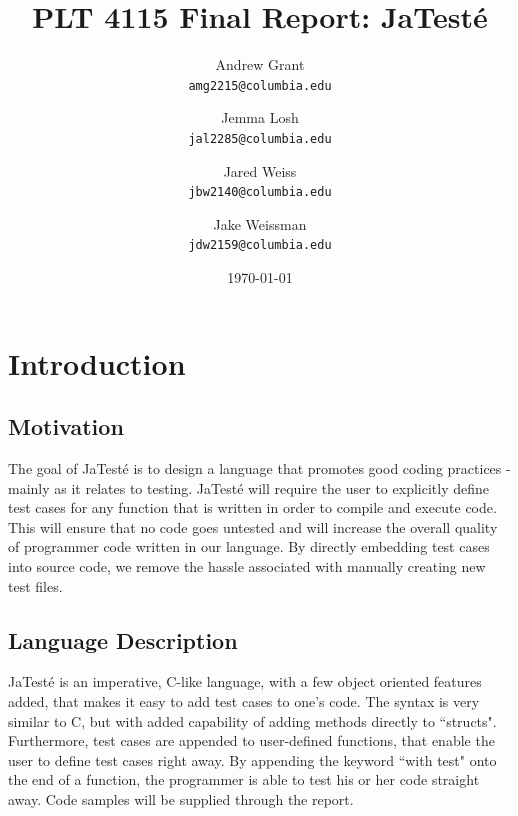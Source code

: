 \documentclass{article}
\title{PLT 4115 Final Report: \textbf{JaTest\'{e}}}
\author{
	Andrew Grant\\
	\texttt{amg2215@columbia.edu}
	\and
	Jemma Losh\\
	\texttt{jal2285@columbia.edu}
	\and
	Jared Weiss\\
	\texttt{jbw2140@columbia.edu}
	\and
	Jake Weissman\\
	\texttt{jdw2159@columbia.edu}
}
\date{\today}
\begin{document}
\maketitle
\newpage

\tableofcontents
\newpage

\section{Introduction}

\subsection{Motivation}
The goal of JaTest\'{e} is to design a language that promotes good coding practices - mainly as it relates to testing.  JaTest\'{e} will require the user to explicitly define test cases for any function that is written in order to compile and execute code.  This will ensure that no code goes untested and will increase the overall quality of programmer code written in our language. By directly embedding test cases into source code, we remove the hassle associated with manually creating new test files.

\subsection {Language Description}
JaTest\'{e} is an imperative, C-like language, with a few object oriented features added, that makes it easy to add test cases to one's code. The syntax is very similar to C, but with added capability of adding methods directly 
to ``structs". Furthermore, test cases are appended to user-defined functions, that enable the user to define test cases right away. By appending the keyword ``with test" onto the end of a function, the programmer is able to test his or her code straight away. Code samples will be supplied through the report. 
\end{document}
